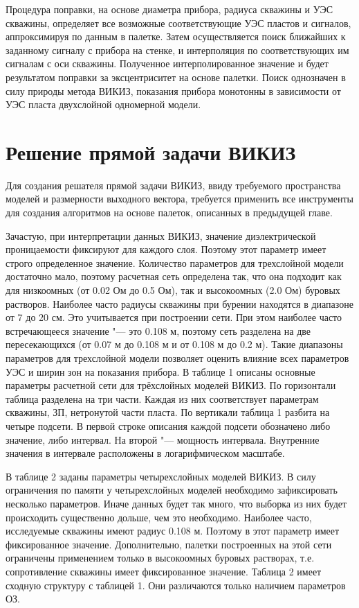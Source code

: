 Процедура поправки, на основе диаметра прибора, радиуса скважины и УЭС
скважины, определяет все возможные соответствующие УЭС пластов и сигналов,
аппроксимируя по данным в палетке. Затем осуществляется поиск ближайших к
заданному сигналу с прибора на стенке, и интерполяция по соответствующих им
сигналам с оси скважины. Полученное интерполированное значение и будет
результатом поправки за эксцентриситет на основе палетки. Поиск однозначен
в силу природы метода ВИКИЗ, показания прибора монотонны в зависимости от
УЭС пласта двухслойной одномерной модели.


\section{Решение прямой задачи ВИКИЗ}
Для создания решателя прямой задачи ВИКИЗ, ввиду требуемого пространства
моделей и размерности выходного вектора, требуется применить все
инструменты для создания алгоритмов на основе палеток, описанных в
предыдущей главе.

Зачастую, при интерпретации данных ВИКИЗ, значение диэлектрической
проницаемости фиксируют для каждого слоя. Поэтому этот параметр имеет
строго определенное значение. Количество параметров для трехслойной модели
достаточно мало, поэтому расчетная сеть определена так, что она подходит
как для низкоомных (от 0.02 Ом до 0.5 Ом), так и высокоомных (2.0 Ом)
буровых растворов. Наиболее часто радиусы скважины при бурении находятся в
диапазоне от 7 до 20 см. Это учитывается при построении сети. При этом
наиболее часто встречающееся значение "--- это 0.108 м, поэтому сеть
разделена на две пересекающихся (от 0.07 м до 0.108 м и от 0.108 м до 0.2
м). Такие диапазоны параметров для трехслойной модели позволяет оценить
влияние всех параметров УЭС и ширин зон на показания прибора. В таблице 1
описаны основные параметры расчетной сети для трёхслойных моделей ВИКИЗ. По
горизонтали таблица разделена на три части. Каждая из них соответствует
параметрам скважины, ЗП, нетронутой части пласта. По вертикали таблица 1
разбита на четыре подсети. В первой строке описания каждой подсети
обозначено либо значение, либо интервал. На второй "--- мощность интервала.
Внутренние значения в интервале расположены в логарифмическом масштабе.

В таблице 2 заданы параметры четырехслойных моделей ВИКИЗ. В силу
ограничения по памяти у четырехслойных моделей необходимо зафиксировать
несколько параметров. Иначе данных будет так много, что выборка из них
будет происходить существенно дольше, чем это необходимо. Наиболее часто,
исследуемые скважины имеют радиус 0.108 м. Поэтому в этот параметр имеет
фиксированное значение. Дополнительно, палетки построенных на этой сети
ограничены применением только в высокоомных буровых растворах, т.е.
сопротивление скважины имеет фиксированное значение. Таблица 2 имеет
сходную структуру с таблицей 1. Они различаются только наличием параметров
ОЗ.

